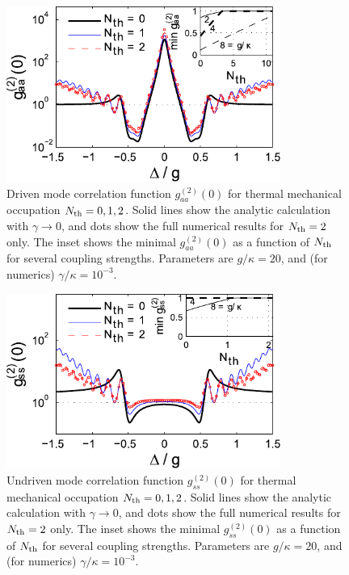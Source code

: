 \begin{figure}
\centering
  \includegraphics[width=0.8\textwidth]{./figs_Komar2013/fig4b.pdf}
  \caption{
  \label{fig:thermal_g2_b}
  Driven mode correlation function $g^{(2)}_{aa}(0)$
  for thermal mechanical occupation $N_{\rm th} = 0,1,2$.
  Solid lines show the analytic calculation with $\gamma \rightarrow 0$,
   and  dots show the full numerical results for $N_{\rm th} = 2$ only.
  The inset shows the minimal $g^{(2)}_{aa}(0)$ as a function of $N_{\rm th}$ 
  for several
  coupling strengths. 
  Parameters are $g/\kappa=20$, and (for numerics) $\gamma/\kappa =  10^{-3}$.
}
\end{figure} 

\begin{figure}
\centering
  \includegraphics[width=0.8\textwidth]{./figs_Komar2013/fig4c.pdf}
  \caption{
  \label{fig:thermal_g2_c}
  Undriven mode correlation function $g^{(2)}_{ss}(0)$
  for thermal mechanical occupation $N_{\rm th} = 0,1,2$.
  Solid lines show the analytic calculation with $\gamma \rightarrow 0$,
   and  dots show the full numerical results for $N_{\rm th} = 2$ only.
  The inset shows the minimal $g^{(2)}_{ss}(0)$ as a function of $N_{\rm th}$ 
  for several
  coupling strengths. 
  Parameters are $g/\kappa=20$, and (for numerics) $\gamma/\kappa =  10^{-3}$.
}
\end{figure} 


